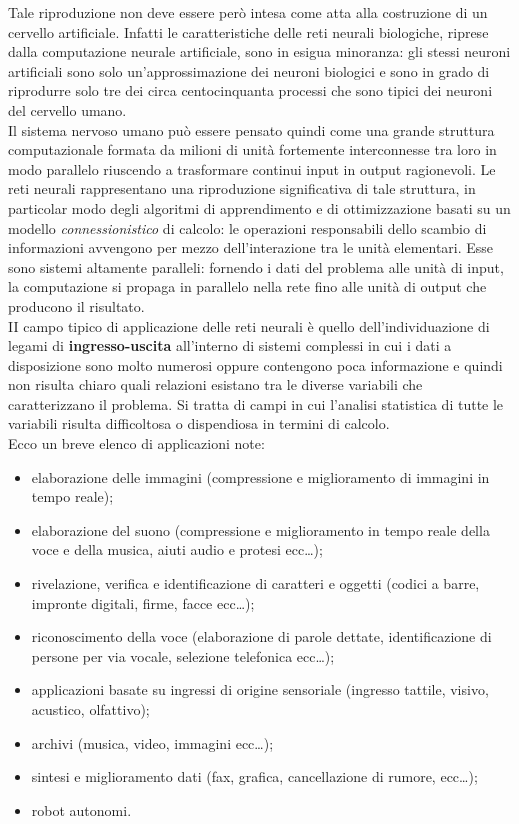 \documentclass[12pt,a4paper,oneside]{book}
\begin{document}
		Tale riproduzione non deve essere però intesa come atta alla costruzione di un cervello artificiale. Infatti le caratteristiche delle reti neurali biologiche, riprese dalla computazione neurale artificiale, sono in esigua minoranza: gli stessi neuroni artificiali sono solo un’approssimazione dei neuroni biologici e sono in grado di riprodurre solo tre dei circa centocinquanta processi che sono tipici dei neuroni del cervello umano.
		\\Il sistema nervoso umano può essere pensato quindi come una grande struttura computazionale formata da milioni di unità fortemente interconnesse tra loro in modo parallelo riuscendo a trasformare continui input in output ragionevoli. Le reti neurali rappresentano una riproduzione significativa di tale struttura, in particolar modo degli algoritmi di apprendimento e di ottimizzazione basati su un modello \emph{connessionistico} di calcolo: le operazioni responsabili dello scambio di informazioni avvengono per mezzo dell'interazione tra le unità elementari. Esse sono sistemi altamente paralleli: fornendo i dati del problema alle unità di input, la computazione si propaga in parallelo nella rete fino alle unità di output che producono il risultato.\\
		II campo tipico di applicazione delle reti neurali è quello dell'individuazione di legami di \textbf{ingresso-uscita} all'interno di sistemi complessi in cui i dati a disposizione sono molto 
		numerosi oppure contengono poca informazione e quindi non risulta chiaro quali relazioni esistano tra le diverse variabili che caratterizzano il problema. Si tratta di campi in cui l'analisi statistica di tutte le variabili risulta difficoltosa o dispendiosa in termini di calcolo.\\ 
		Ecco un breve elenco di applicazioni note:
		
		\begin{itemize}
			\item elaborazione delle immagini (compressione e miglioramento di immagini in tempo reale);
			\item elaborazione del suono (compressione e miglioramento in tempo reale della voce e della musica, aiuti audio e protesi ecc\dots);
			\item rivelazione, verifica e identificazione di caratteri e oggetti (codici a barre, impronte digitali, firme, facce ecc\dots );  
			\item riconoscimento della voce (elaborazione di parole dettate, identificazione di persone per via vocale, selezione telefonica ecc\dots );
			\item applicazioni basate su ingressi di origine sensoriale (ingresso tattile, visivo, acustico, olfattivo);
			\item archivi (musica, video, immagini ecc\dots);
			\item sintesi e miglioramento dati (fax, grafica, cancellazione di rumore, ecc\dots);
			\item robot autonomi.
		\end{itemize}
\end{document}
